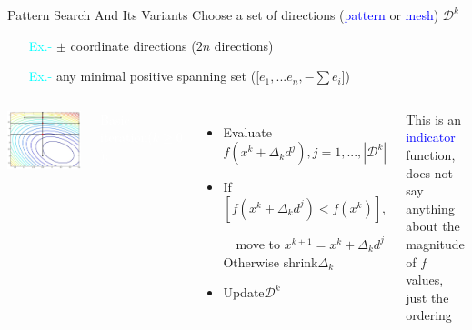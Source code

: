 \documentclass[handout,aspectratio=54]{beamer}
\numberwithin{theorem}{section}
\begin{document}
\begin{frame}{Pattern Search And Its Variants}\footnotesize
Choose a set of directions (\textcolor{blue}{pattern} or \textcolor{blue}{mesh}) $\mathcal{D}^k$

\begin{itemize}
\item[\textcolor{cyan}{Ex.-}] $\pm$ coordinate directions ($2n$ directions)
\item[\textcolor{cyan}{Ex.-}] any minimal positive spanning set ([$e_1,...e_n,-\sum e_i$])
\end{itemize}

\begin{columns}
\includegraphics[width=\textwidth]{fig/17-4.jpg}

\colorbox[rgb]{0.5,0.6,0.7}{\textcolor{white}{Basic iteration($k\ge0$):}}
\begin{itemize}\scriptsize
\item Evaluate $f(x^k+\Delta_kd^j),j=1,...,|\mathcal{D}^k|$
\item If $[f(x^k+\Delta_kd^j)<f(x^k)]$, 

$\quad$move to $x^{k+1}=x^k+\Delta_kd^j$\\

Otherwise shrink$\Delta_k$
\item Update$\mathcal{D}^k$
\end{itemize}
This is an \textcolor{blue}{indicator} function, does not say anything about the magnitude of $f$ values, just the ordering
\end{columns}

\vspace{1.2cm}

\tiny
{}

\end{frame}
\end{document}
